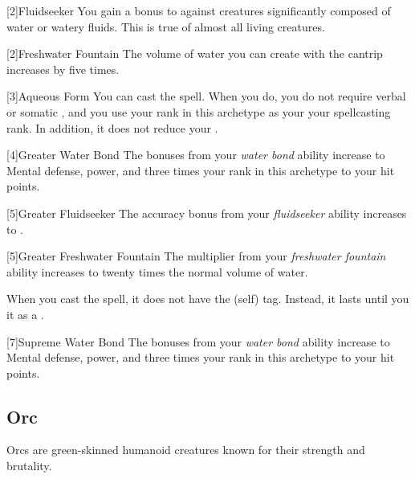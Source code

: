             [2]{Fluidseeker} You gain a  bonus to  against creatures significantly composed of water or watery fluids.
            This is true of almost all living creatures.

            [2]{Freshwater Fountain} The volume of water you can create with the  cantrip increases by five times.

            [3]{Aqueous Form} You can cast the  spell.
            When you do, you do not require verbal or somatic , and you use your rank in this archetype as your your spellcasting rank.
            In addition, it does not reduce your .

            [4]{Greater Water Bond} The bonuses from your \textit{water bond} ability increase to  Mental defense,  power, and three times your rank in this archetype to your hit points.

            [5]{Greater Fluidseeker} The accuracy bonus from your \textit{fluidseeker} ability increases to .

            [5]{Greater Freshwater Fountain} The multiplier from your \textit{freshwater fountain} ability increases to twenty times the normal volume of water.

             When you cast the  spell, it does not have the  (self) tag.
            Instead, it lasts until you  it as a .

            [7]{Supreme Water Bond} The bonuses from your \textit{water bond} ability increase to  Mental defense,  power, and three times your rank in this archetype to your hit points.

    \subsection{Orc}
        Orcs are green-skinned humanoid creatures known for their strength and brutality.


